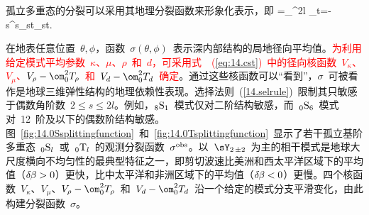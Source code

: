 孤立多重态的分裂可以采用其地理分裂函数来形象化表示，即
\eq
\sigma=\sum_{}^{2l}
\sum_{t=-s}^s\sigma_{st}\sY_{st}.
\label{eq:14.splittingfunction}
\en

在地表任意位置~$\theta,\phi$，函数~$\sigma(\theta,\phi)$~表示深内部结构的局地径向平均值。\textcolor{red}{为利用给定模式平均参数~$\kappa$、$\mu$、$\rho$~和~$d$，可采用式~~(\ref{eq:14.cst})~中的径向核函数~$V_\kappa$、$V_\mu$、$V_\rho-\om_0^2T_\rho$~和~$V_d-\om_0^2T_d$~确定}。通过这些核函数可以“看到”，$\sigma$~可被看作是地球三维弹性结构的地理依赖性表现。选择法则~(\ref{14.selrule})~限制其只敏感于偶数角阶数~$2\leq s\leq 2l$。例如，${}_8{\rm S}_1$~模式仅对二阶结构敏感，而~${}_0{\rm S}_6$~模式对~12~阶及以下的偶数阶结构敏感。图~\ref{fig:14.0Ssplittingfunction}~和~\ref{fig:14.0Tsplittingfunction}~显示了若干孤立基阶多重态~${}_0{\rm S}_l$~或~${}_0{\rm T}_l$~的观测分裂函数~$\sigma^{\rm obs}$。以~$\sY_{2\,\pm 2}$~为主的相干模式是地球大尺度横向不均匀性的最典型特征之一，即剪切波速比美洲和西太平洋区域下的平均值（$\delta\hspace{-0.2 mm}\beta>0$）更快，比中太平洋和非洲区域下的平均值（$\delta\hspace{-0.2 mm}\beta<0$）更慢。四个核函数~$V_\kappa$、$V_\mu$、$V_\rho-\om_0^2T_\rho$~和~$V_d-\om_0^2T_d$~沿一个给定的模式分支平滑变化，由此构建分裂函数~$\sigma$。

